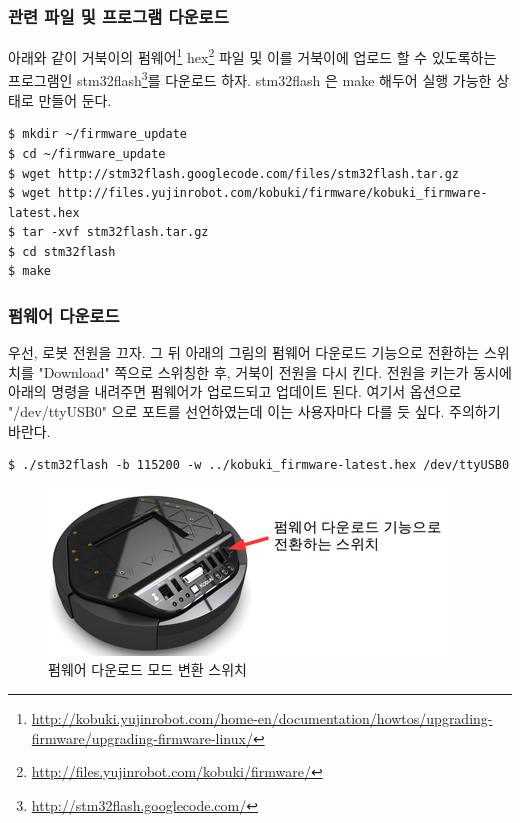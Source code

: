 \subsubsection{관련 파일 및 프로그램 다운로드}

아래와 같이 거북이의 펌웨어\footnote{\url{http://kobuki.yujinrobot.com/home-en/documentation/howtos/upgrading-firmware/upgrading-firmware-linux/}} hex\footnote{\url{http://files.yujinrobot.com/kobuki/firmware/}} 파일 및 이를 거북이에 업로드 할 수 있도록하는 프로그램인 stm32flash\footnote{\url{http://stm32flash.googlecode.com/}}를 다운로드 하자. stm32flash 은 make 해두어 실행 가능한 상태로 만들어 둔다. 

\vspace{\baselineskip}
\begin{lstlisting}[language=ROS]
$ mkdir ~/firmware_update
$ cd ~/firmware_update
$ wget http://stm32flash.googlecode.com/files/stm32flash.tar.gz
$ wget http://files.yujinrobot.com/kobuki/firmware/kobuki_firmware-latest.hex
$ tar -xvf stm32flash.tar.gz
$ cd stm32flash
$ make
\end{lstlisting}


\subsubsection{펌웨어 다운로드}

우선, 로봇 전원을 끄자. 그 뒤 아래의 그림의 펌웨어 다운로드 기능으로 전환하는 스위치를 "Download" 쪽으로 스위칭한 후, 거북이 전원을 다시 킨다. 전원을 키는가 동시에 아래의 명령을 내려주면 펌웨어가 업로드되고 업데이트 된다. 여기서 옵션으로 "/dev/ttyUSB0" 으로 포트를 선언하였는데 이는 사용자마다 다를 듯 싶다. 주의하기 바란다.

\vspace{\baselineskip}
\begin{lstlisting}[language=ROS]
$ ./stm32flash -b 115200 -w ../kobuki_firmware-latest.hex /dev/ttyUSB0
\end{lstlisting}

\begin{figure}[h]
\centering\includegraphics[width=0.6\columnwidth]{pictures/chapter10/firmware_download.png}
\caption{펌웨어 다운로드 모드 변환 스위치}
\end{figure}

